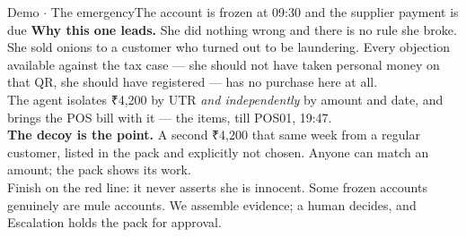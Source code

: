 \documentclass[aspectratio=169,10pt]{beamer}
\begin{document}
\begin{frame}{Demo $\cdot$ The emergency}{The account is frozen at 09:30 and the supplier payment is due}
{\textbf{Why this one leads.} She did nothing wrong and there is no rule she broke.
She sold onions to a customer who turned out to be laundering. Every objection
available against the tax case --- she should not have taken personal money on that
QR, she should have registered --- has no purchase here at all.
\\[0.4em]
The agent isolates ₹4,200 by UTR \emph{and independently} by amount and date, and
brings the POS bill with it --- the items, till POS01, 19:47.
\\[0.4em]
\textbf{The decoy is the point.} A second ₹4,200 that same week from a regular
customer, listed in the pack and explicitly not chosen. Anyone can match an amount;
the pack shows its work.
\\[0.4em]
Finish on the red line: it never asserts she is innocent. Some frozen accounts
genuinely are mule accounts. We assemble evidence; a human decides, and Escalation
holds the pack for approval.}
\end{frame}
\end{document}
